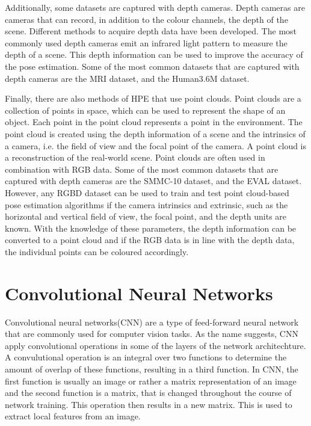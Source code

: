 Additionally, some datasets are captured with depth cameras. Depth cameras are cameras that can record, in addition to the colour channels, the depth of the scene. Different methods to acquire depth data have been developed. The most commonly used depth cameras emit an infrared light pattern to measure the depth of a scene. This depth information can be used to improve the accuracy of the pose estimation. Some of the most common datasets that are captured with depth cameras are the MRI dataset\cite{mRI}, and the Human3.6M dataset\cite{h36m_pami}.

Finally, there are also methods of HPE that use point clouds. Point clouds are a collection of points in space, which can be used to represent the shape of an object. Each point in the point cloud represents a point in the environment. The point cloud is created using the depth information of a scene and the intrinsics of a camera, i.e. the field of view and the focal point of the camera. A point cloud is a reconstruction of the real-world scene. Point clouds are often used in combination with RGB data. Some of the most common datasets that are captured with depth cameras are the SMMC-10 dataset\cite{SMMC10}, and the EVAL dataset\cite{EVAL}. However, any RGBD dataset can be used to train and test point cloud-based pose estimation algorithms if the camera intrinsics and extrinsic, such as the horizontal and vertical field of view, the focal point, and the depth units are known. With the knowledge of these parameters, the depth information can be converted to a point cloud and if the RGB data is in line with the depth data, the individual points can be coloured accordingly.

\section{Convolutional Neural Networks}

Convolutional neural networks(CNN) are a type of feed-forward neural network that are commonly used for computer vision tasks. As the name suggests, CNN apply convolutional operations in some of the layers of the network architechture. A convulutional operation is an integral over two functions to determine the amount of overlap of these functions, resulting in a third function. In CNN, the first function is usually an image or rather a matrix representation of an image and the second function is a matrix, that is changed throughout the course of network training. This operation then results in a new matrix. This is used to extract local features from an image.

